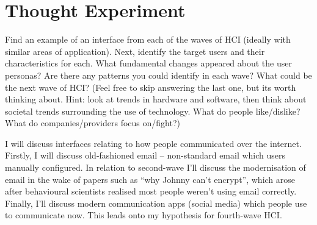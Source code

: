 \documentclass[10pt,\jkfside,a4paper]{article}
\begin{document}
\section{Thought Experiment}

Find an example of an interface from each of the waves of HCI (ideally with
similar areas of application). Next, identify the target users and their
characteristics for each. What fundamental changes appeared about the user
personas? Are there any patterns you could identify in each wave? What could
be the next wave of HCI? (Feel free to skip answering the last one, but its
worth thinking about. Hint: look at trends in hardware and software,
then think about societal trends surrounding the use of technology. What do
people like/dislike? What do companies/providers focus on/fight?)

I will discuss interfaces relating to how people communicated over the
internet. Firstly, I will discuss old-fashioned email -- non-standard email
which users manually configured. In relation to second-wave I'll discuss the
modernisation of email in the wake of papers such as ``why Johnny can't
encrypt'', which arose after behavioural scientists realised most people
weren't using email correctly. Finally, I'll discuss modern
communication apps (social media) which people use to communicate now. This
leads onto my hypothesis for fourth-wave HCI\@.
\end{document}
